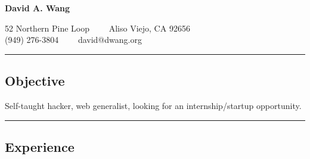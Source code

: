 \documentclass[10pt,letterpaper]{article}
\newenvironment{indentsection}[1]%
{\begin{list}{}%
  {\setlength{\leftmargin}{#1}}%
  \item[]%
}
{\end{list}}
\begin{document}
\begin{center}
{\LARGE \textbf{David A. Wang}}

52 Northern Pine Loop\ \ \textbullet
\ \ Aliso Viejo, CA 92656
\\
(949) 276-3804\ \ \textbullet
\ \ david@dwang.org
\end{center}


\hrule
\vspace{-0.4em}
\subsection*{Objective}
\begin{indentsection}{\parindent}
\begin{description*}
  \item Self-taught hacker, web generalist, looking for an internship/startup opportunity.
\end{description*}
\end{indentsection}

\hrule
\vspace{-0.4em}
\subsection*{Experience}
\end{document}
